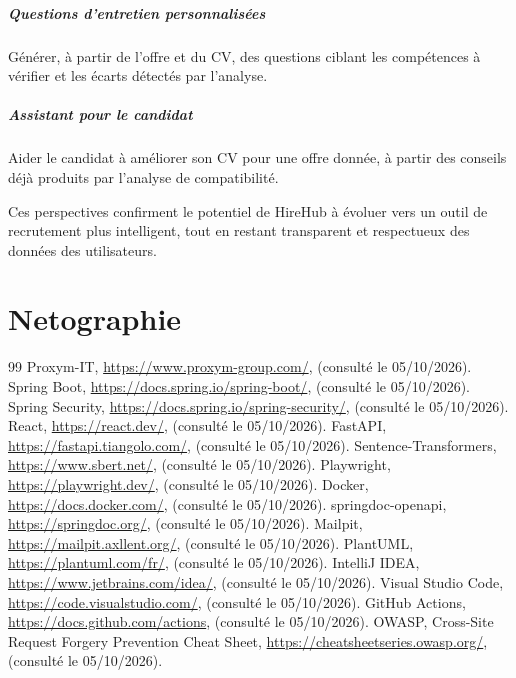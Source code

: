 \documentclass[12pt,a4paper]{report}
\begin{document}
\paragraph{Questions d'entretien personnalisées} Générer, à partir de l'offre et du CV, des questions ciblant les compétences à vérifier et les écarts détectés par l'analyse.

\paragraph{Assistant pour le candidat} Aider le candidat à améliorer son CV pour une offre donnée, à partir des conseils déjà produits par l'analyse de compatibilité.

Ces perspectives confirment le potentiel de HireHub à évoluer vers un outil de recrutement plus intelligent, tout en restant transparent et respectueux des données des utilisateurs.

\chapter*{Netographie}
\renewcommand{\bibname}{}
\begingroup
\renewcommand{\chapter}[2]{}
\begin{thebibliography}{99}
 Proxym-IT, \url{https://www.proxym-group.com/}, (consulté le 05/10/2026).
 Spring Boot, \url{https://docs.spring.io/spring-boot/}, (consulté le 05/10/2026).
 Spring Security, \url{https://docs.spring.io/spring-security/}, (consulté le 05/10/2026).
 React, \url{https://react.dev/}, (consulté le 05/10/2026).
 FastAPI, \url{https://fastapi.tiangolo.com/}, (consulté le 05/10/2026).
 Sentence-Transformers, \url{https://www.sbert.net/}, (consulté le 05/10/2026).
 Playwright, \url{https://playwright.dev/}, (consulté le 05/10/2026).
 Docker, \url{https://docs.docker.com/}, (consulté le 05/10/2026).
 springdoc-openapi, \url{https://springdoc.org/}, (consulté le 05/10/2026).
 Mailpit, \url{https://mailpit.axllent.org/}, (consulté le 05/10/2026).
 PlantUML, \url{https://plantuml.com/fr/}, (consulté le 05/10/2026).
 IntelliJ IDEA, \url{https://www.jetbrains.com/idea/}, (consulté le 05/10/2026).
 Visual Studio Code, \url{https://code.visualstudio.com/}, (consulté le 05/10/2026).
 GitHub Actions, \url{https://docs.github.com/actions}, (consulté le 05/10/2026).
 OWASP, Cross-Site Request Forgery Prevention Cheat Sheet, \url{https://cheatsheetseries.owasp.org/}, (consulté le 05/10/2026).
\end{thebibliography}
\endgroup
\end{document}
